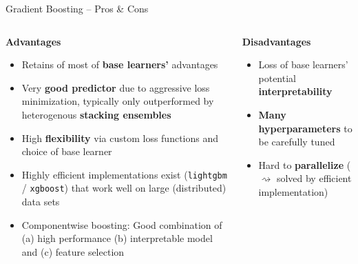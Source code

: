 \documentclass[11pt,compress,t,notes=noshow, xcolor=table]{beamer}
\newcommand{\highlight}[1]{\textcolor{hlcol}{\textbf{#1}}}
\newcommand{\positem}{\item[\textcolor{hlcol}{$\bm{+}$}]}
\newcommand{\negitem}{\item[\textcolor{hlcol}{$\bm{-}$}]}
\begin{document}

\begin{vbframe}{Gradient Boosting -- Pros \& Cons}
  \footnotesize

\begin{columns}[onlytextwidth]
  \begin{column}{0.5\textwidth}
    \highlight{Advantages}
    \footnotesize
    \begin{itemize}
      \positem Retains of most of \textbf{base learners'} advantages 
      \positem Very \textbf{good predictor} due to aggressive loss minimization, typically only outperformed by heterogenous \textbf{stacking ensembles}
      \positem High \textbf{flexibility} via custom loss functions and choice of base learner
      \positem Highly efficient implementations exist (\texttt{lightgbm} / \texttt{xgboost}) that work well on large (distributed) data sets
      \positem Componentwise boosting: Good combination of (a) high performance (b) interpretable model and (c) feature selection
    \end{itemize}
  \end{column}
  \begin{column}{0.5\textwidth}
    \highlight{Disadvantages}
    \footnotesize
    \begin{itemize}
      \negitem Loss of base learners' potential \textbf{interpretability}
      \negitem \textbf{Many hyperparameters} 
      to be carefully tuned
      \negitem Hard to \textbf{parallelize} ($\rightsquigarrow$ solved by efficient implementation)
    \end{itemize}
  \end{column}
\end{columns}

\end{vbframe}
\end{document}
